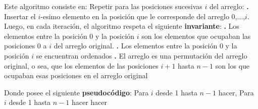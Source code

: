 \documentclass[10pt,a4paper]{article}
\begin{document}
Este algoritmo consiste en:
\newline
\newline
Repetir para las posiciones sucesivas $i$ del arreglo:
\newline
\newline
\textbf{.} Insertar el $i$-esimo elemento en la posición que le corresponde del arreglo 0,...,$i$.
\newline
\newline
Luego, en cada iteración, el algoritmo respeta el siguiente \textbf{invariante}:
\newline
\newline
\textbf{.} Los elementos entre la posición 0 y la posición $i$ son los elementos que ocupaban las posiciones 0 a $i$ del arreglo original.
\newline
\newline
\textbf{.} Los elementos entre la posición 0 y la posición $i$ se encuentran ordenados
\newline
\newline
\textbf{.} El arreglo es una permutación del arreglo original, o sea, que los elementos de las posiciones $i+1$ hasta $n-1$ son los que ocupaban esas posiciones en el arreglo original
\newline
\newline

Donde posee el siguiente \textbf{pseudocódigo}:
\newline
\newline
Para $i$ desde 1 hasta $n-1$ hacer, 
\newline
\newline
Para $i$ desde 1 hasta $n-1$ hacer
\newline
\newline
{}
\newline
\newline
{} hacer
\newline
\newline
{} 
\newline
\newline
{} 
\newline
\newline
{} 
\newline
\newline
{} 
\newpage
\end{document}
